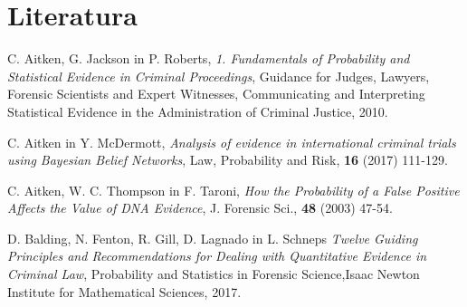 \documentclass{beamer}
\begin{document}
\section{Literatura}

\begin{frame}
    \begin{thebibliography}{99}
            C. Aitken, G. Jackson in P. Roberts, \emph{1. Fundamentals of Probability and Statistical Evidence in Criminal Proceedings}, Guidance for Judges, Lawyers, Forensic Scientists and Expert Witnesses, Communicating and Interpreting Statistical Evidence in the Administration of Criminal Justice, 2010.
    
            C. Aitken in Y. McDermott, \emph{Analysis of evidence in international criminal trials using Bayesian Belief Networks}, Law, Probability and Risk, \textbf{16} (2017) 111-129.
    
            C. Aitken, W. C. Thompson in F. Taroni, \emph{How the Probability of a False Positive Affects the Value of DNA Evidence}, J. Forensic Sci., \textbf{48} (2003) 47-54.
    
            D. Balding, N. Fenton, R. Gill, D. Lagnado in L. Schneps \emph{Twelve Guiding Principles and Recommendations for Dealing with Quantitative Evidence in Criminal Law}, Probability and Statistics in Forensic Science,Isaac Newton Institute for Mathematical Sciences, 2017.
    \end{thebibliography}
\end{frame}
\end{document}

